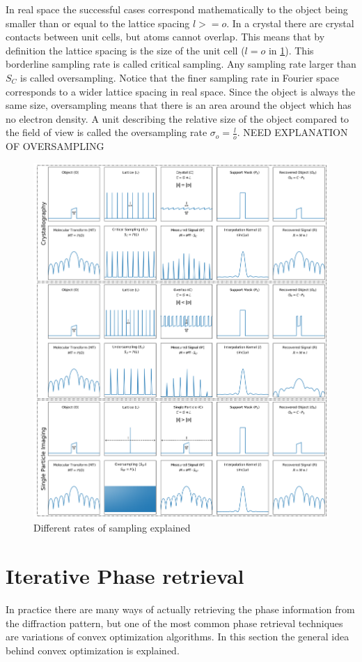 In real space the successful cases correspond mathematically to the object being smaller than or equal to the lattice spacing $l >= o$. In a crystal there are crystal contacts between unit cells, but atoms cannot overlap. This means that by definition the lattice spacing is the size of the unit cell ($l=o$ in \ref{fig:sampling}). This borderline sampling rate is called critical sampling. Any sampling rate larger than $S_C$ is called oversampling. Notice that the finer sampling rate in Fourier space corresponds to a wider lattice spacing in real space. Since the object is always the same size, oversampling means that there is an area around the object which has no electron density. A unit describing the relative size of the object compared to the field of view is called the oversampling rate $\sigma_o = \frac{l}{o}$.
NEED EXPLANATION OF OVERSAMPLING

\begin{figure}[h]\label{fig:sampling}
\centering 
\includegraphics[width=120mm]{SamplingTheory.png}

\caption{Different rates of sampling explained}
\end{figure}

\section{Iterative Phase retrieval}
In practice there are many ways of actually retrieving the phase information from the diffraction pattern, but one of the most common phase retrieval techniques are variations of convex optimization algorithms. In this section the general idea behind convex optimization is explained.

